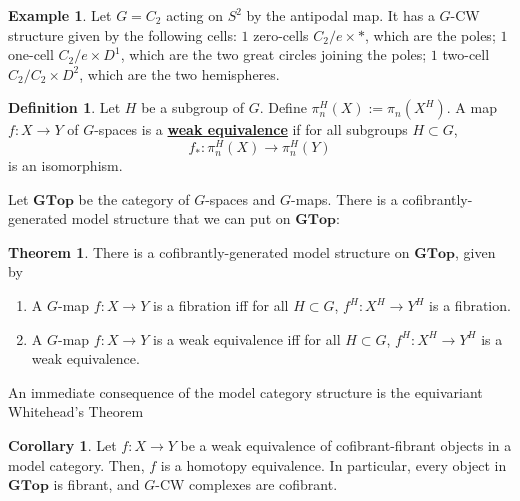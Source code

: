 \documentclass{article}
\theoremstyle{definition}
\newtheorem{theorem}{Theorem}[section]
\theoremstyle{definition}
\newtheorem{definition}{Definition}[theorem]
\theoremstyle{definition}
\theoremstyle{definition}
\theoremstyle{definition}
\theoremstyle{definition}
\newtheorem{corollary}{Corollary}[theorem]
\theoremstyle{definition}
\newtheorem{example}{Example}[theorem]
\begin{document}
    
    \begin{tcolorbox}[colback=yellow!5!white,colframe=yellow!30!white]
    \begin{example}
        Let $G=C_2$ acting on $S^2$ by the antipodal map. It has a $G$-CW structure given by the following cells: $1$ zero-cells $C_2/e\times *$, which are the poles; $1$ one-cell $C_2/e\times D^1$, which are the two great circles joining the poles; $1$ two-cell $C_2/C_2\times D^2$, which are the two hemispheres. 
    \end{example}
    \end{tcolorbox}
    
    
    \begin{tcolorbox}[colback=purple!5!white,colframe=purple!75!black]
    \begin{definition}
    Let $H$ be a subgroup of $G$. Define $\pi_n^H(X):=\pi_n(X^H)$. A map $f: X\to Y$ of $G$-spaces is a \underline{\textbf{weak equivalence}} if for all subgroups $H\subset G$,
    \[f_*:\pi_n^H(X)\to \pi_n^H(Y)\]
    is an isomorphism. 
    \end{definition}
    \end{tcolorbox}
    
    Let $\textbf{GTop}$ be the category of $G$-spaces and $G$-maps. There is a cofibrantly-generated model structure that we can put on $\textbf{GTop}$:
    
    \begin{tcolorbox}[colback=red!5!white,colframe=red!30!white]
    \begin{theorem}
        There is a cofibrantly-generated model structure on $\textbf{GTop}$, given by 
        \begin{enumerate}
            \item A $G$-map $f:X\to Y$ is a fibration iff for all $H\subset G$, $f^H: X^H\to Y^H$ is a fibration.
            \item A $G$-map $f:X\to Y$ is a weak equivalence iff for all $H\subset G$, $f^H: X^H\to Y^H$ is a weak equivalence. 
        \end{enumerate}
    \end{theorem}
    \end{tcolorbox}
    An immediate consequence of the model category structure is the equivariant Whitehead's Theorem
    
    \begin{tcolorbox}[colback=green!5!white,colframe=green!30!white]
    \begin{corollary}
    Let $f: X\to Y$ be a weak equivalence of cofibrant-fibrant objects in a model category. Then, $f$ is a homotopy equivalence. In particular, every object in $\textbf{GTop}$ is fibrant, and $G$-CW complexes are  cofibrant. 
    \end{corollary}
    \end{tcolorbox}
    
\end{document}
